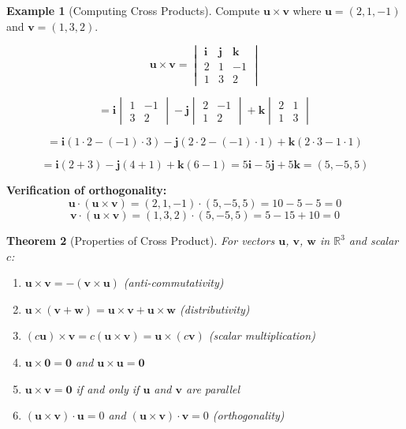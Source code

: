 \documentclass[12pt]{article}
\numberwithin{equation}{section}
\newcommand{\vect}[1]{\boldsymbol{#1}}   %
\theoremstyle{plain}
\newtheorem{theorem}{Theorem}[section]
\theoremstyle{definition}
\newtheorem{example}[theorem]{Example}
\theoremstyle{remark}
\begin{document}
\begin{example}[Computing Cross Products]
Compute $\vect{u} \times \vect{v}$ where $\vect{u} = (2, 1, -1)$ and $\vect{v} = (1, 3, 2)$.

$$\vect{u} \times \vect{v} = \begin{vmatrix} \vect{i} & \vect{j} & \vect{k} \\ 2 & 1 & -1 \\ 1 & 3 & 2 \end{vmatrix}$$

$$= \vect{i}\begin{vmatrix} 1 & -1 \\ 3 & 2 \end{vmatrix} - \vect{j}\begin{vmatrix} 2 & -1 \\ 1 & 2 \end{vmatrix} + \vect{k}\begin{vmatrix} 2 & 1 \\ 1 & 3 \end{vmatrix}$$

$$= \vect{i}(1 \cdot 2 - (-1) \cdot 3) - \vect{j}(2 \cdot 2 - (-1) \cdot 1) + \vect{k}(2 \cdot 3 - 1 \cdot 1)$$

$$= \vect{i}(2 + 3) - \vect{j}(4 + 1) + \vect{k}(6 - 1) = 5\vect{i} - 5\vect{j} + 5\vect{k} = (5, -5, 5)$$

\textbf{Verification of orthogonality:}
$$\vect{u} \cdot (\vect{u} \times \vect{v}) = (2, 1, -1) \cdot (5, -5, 5) = 10 - 5 - 5 = 0$$ \checkmark
$$\vect{v} \cdot (\vect{u} \times \vect{v}) = (1, 3, 2) \cdot (5, -5, 5) = 5 - 15 + 10 = 0$$ \checkmark
\end{example}

\begin{theorem}[Properties of Cross Product]
For vectors $\vect{u}$, $\vect{v}$, $\vect{w}$ in $\mathbb{R}^3$ and scalar $c$:
\begin{enumerate}
\item $\vect{u} \times \vect{v} = -(\vect{v} \times \vect{u})$ (anti-commutativity)
\item $\vect{u} \times (\vect{v} + \vect{w}) = \vect{u} \times \vect{v} + \vect{u} \times \vect{w}$ (distributivity)
\item $(c\vect{u}) \times \vect{v} = c(\vect{u} \times \vect{v}) = \vect{u} \times (c\vect{v})$ (scalar multiplication)
\item $\vect{u} \times \vect{0} = \vect{0}$ and $\vect{u} \times \vect{u} = \vect{0}$
\item $\vect{u} \times \vect{v} = \vect{0}$ if and only if $\vect{u}$ and $\vect{v}$ are parallel
\item $(\vect{u} \times \vect{v}) \cdot \vect{u} = 0$ and $(\vect{u} \times \vect{v}) \cdot \vect{v} = 0$ (orthogonality)
\end{enumerate}
\end{theorem}
\end{document}
